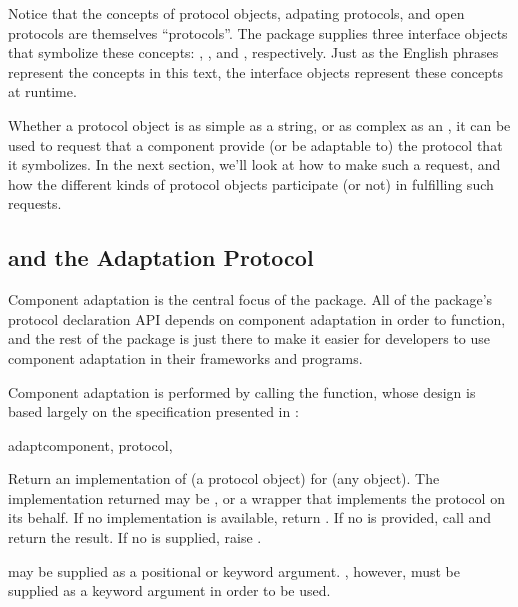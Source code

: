 Notice that the concepts of protocol objects, adpating protocols, and open
protocols are themselves ``protocols''.  The  package supplies
three interface objects that symbolize these concepts: ,
, and , respectively.  Just as
the English phrases represent the concepts in this text, the interface objects
represent these concepts at runtime.

Whether a protocol object is as simple as a string, or as complex as an
, it can be used to request that a component provide
(or be adaptable to) the protocol that it symbolizes.  In the next section,
we'll look at how to make such a request, and how the different kinds of
protocol objects participate (or not) in fulfilling such requests.






















\subsection{ and the Adaptation Protocol
\label{adapt-protocol}}

Component adaptation is the central focus of the  package.
All of the package's protocol declaration API depends on component adaptation
in order to function, and the rest of the package is just there to make it
easier for developers to use component adaptation in their frameworks and
programs.

Component adaptation is performed by calling the  function,
whose design is based largely on the specification presented in :

\begin{funcdesc}{adapt}{component, protocol,
}

Return an implementation of  (a protocol object) for
 (any object).  The implementation returned may be
, or a wrapper that implements the protocol on its
behalf.  If no implementation is available, return .  If no
 is provided, call  and return the result.  If no  is supplied,
raise .

 may be supplied as a positional or keyword argument.
, however, must be supplied as a keyword argument in order
to be used.
\end{funcdesc}


